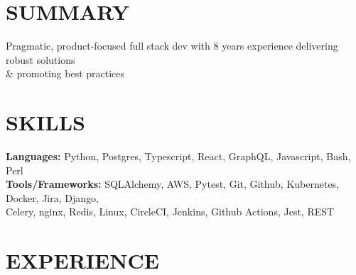 \documentclass[]{resume}
\begin{document}
\begin{resume}
\setlength{\sectionskip}{1.30em}
\section{SUMMARY\makebox[387 px]{\rule[.5 ex]{387 px}{1.0pt}}}
Pragmatic, product-focused full stack dev with 8 years experience delivering robust solutions \\
\& promoting best practices
\section{SKILLS\makebox[416 px]{\rule[.5 ex]{416 px}{1.0pt}}}
\vspace{0.9mm}
\textbf{Languages:} \hspace*{11.5mm}
Python, Postgres, Typescript, React, GraphQL, Javascript, Bash, Perl \\
% 
\textbf{Tools/Frameworks:} SQLAlchemy, AWS, Pytest, Git, Github, Kubernetes, Docker, Jira, Django, \\
\hspace*{32mm}Celery, nginx, Redis, Linux, CircleCI, Jenkins, Github Actions, Jest, REST
\section{EXPERIENCE\makebox[372 px]{\rule[.5 ex]{372 px}{1.0pt}}}


\end{resume}
\end{document}
